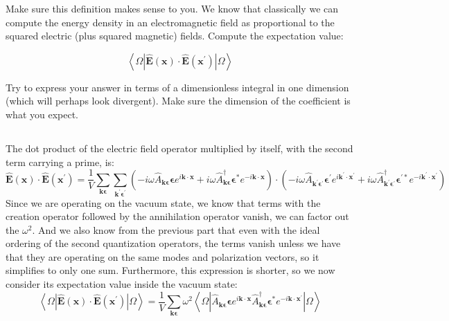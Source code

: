 \documentclass[12pt]{article}
\begin{document}
Make sure this definition makes sense to you. We know that classically we can compute the energy density in an electromagnetic field as proportional to the squared electric (plus squared magnetic) fields. Compute the expectation value:


\begin{equation*}
\left\langle\Omega\left|\hat{\mathbf{E}}(\mathbf{x}) \cdot \hat{\mathbf{E}}\left(\mathbf{x}^{\prime}\right)\right| \Omega\right\rangle \tag{8}
\end{equation*}


Try to express your answer in terms of a dimensionless integral in one dimension (which will perhaps look divergent). Make sure the dimension of the coefficient is what you expect.
\subsection{}
The dot product of the electric field operator multiplied by itself, with the second term carrying a prime, is:
\begin{equation}
  \hat{\mathbf{E}}(\mathbf{x}) \cdot \hat{\mathbf{E}}\left(\mathbf{x}^{\prime}\right) = \frac{1}{V}\sum_{\mathbf{k} \boldsymbol{\epsilon}}\sum_{\mathbf{k}^{\prime} \boldsymbol{\epsilon}^{\prime}}\left(-i \omega \hat{A}_{\mathbf{k} \boldsymbol{\epsilon}} \boldsymbol{\epsilon} e^{i \mathbf{k} \cdot \mathbf{x}}+i \omega \hat{A}_{\mathbf{k} \boldsymbol{\epsilon}}^{\dagger} \boldsymbol{\epsilon}^{*} e^{-i \mathbf{k} \cdot \mathbf{x}}\right)\cdot \left(-i \omega \hat{A}_{\mathbf{k}^{\prime} \boldsymbol{\epsilon}^{\prime}} \boldsymbol{\epsilon}^{\prime} e^{i \mathbf{k}^{\prime} \cdot \mathbf{x}^{\prime}}+i \omega \hat{A}_{\mathbf{k}^{\prime} \boldsymbol{\epsilon}^{\prime}}^{\dagger} \boldsymbol{\epsilon}^{\prime *} e^{-i \mathbf{k}^{\prime} \cdot \mathbf{x}^{\prime}}\right)
\end{equation}
Since we are operating on the vacuum state, we know that terms with the creation operator followed by the annihilation operator vanish, we can factor out the $\omega^2$. And we also know from the previous part that even with the ideal ordering of the second quantization operators, the terms vanish unless we have that they are operating on the same modes and polarization vectors, so it simplifies to only one sum. Furthermore, this expression is shorter, so we now consider its expectation value inside the vacuum state:
\begin{equation}
  \left\langle\Omega\left|\hat{\mathbf{E}}(\mathbf{x}) \cdot \hat{\mathbf{E}}\left(\mathbf{x}^{\prime}\right)\right| \Omega\right\rangle = \frac{1}{V}\sum_{\mathbf{k} \boldsymbol{\epsilon}}\omega ^{2}\left\langle\Omega\left|\hat{A}_{\mathbf{k} \boldsymbol{\epsilon}} \boldsymbol{\epsilon} e^{i \mathbf{k} \cdot \mathbf{x}}\hat{A}_{\mathbf{k} \boldsymbol{\epsilon}}^{\dagger} \boldsymbol{\epsilon}^{*} e^{-i \mathbf{k} \cdot \mathbf{x}^{\prime}}\right| \Omega\right\rangle
\end{equation}
\end{document}
